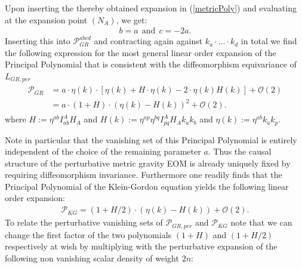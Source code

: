\documentclass[a4paper,12pt, DIV=14, BCOR=5mm, twoside, headsepline, numbers=noenddot]{scrbook}
\begin{document}
Upon inserting the thereby obtained expansion in (\ref{metricPoly}) and evaluating at the expansion point $(N_A)$, we get:
\begin{align}
    b = a \ \ \text{and} \ \ c = -2a.
\end{align}
Inserting this into $\mathcal{P}_{GR}^{abcd}$ and contracting again against $k_a\cdot ...\cdot k_d$ in total we find the following expression for the most general linear order expansion of the Principal Polynomial that is consistent with the diffeomorphism equivariance of $L_{GR,per}$
\begin{align}
\begin{aligned}
    \mathcal{P}_{GR} &= a \cdot  \eta(k) \cdot \left [\eta(k) + H \cdot \eta(k)  -
    2 \cdot  \eta(k) H(k) \right ] + \mathcal{O}(2)\\
    &= a \cdot (1 + H) \cdot (\eta(k) - H(k))^2 + \mathcal{O}(2).
\end{aligned}
\end{align}
where  $H:=\eta^{ab} I^A_{ab} H_{A}$ and $H(k) := \eta^{ap} \eta^{bq} I_{pq}^A H_A k_a k_b$ and $\eta(k) := \eta^{ab}k_a k_p$. 

Note in particular that the vanishing set of this Principal Polynomial is entirely independent of the choice of the remaining parameter $a$. Thus the causal structure of the perturbative metric gravity EOM is already uniquely fixed by requiring diffeomorphism invariance.
Furthermore one readily finds that the Principal Polynomial of the Klein-Gordon equation yields the following linear order expansion:
\begin{align}
    \mathcal{P}_{KG} = (1 + H/2) \cdot (\eta(k) - H(k)) + \mathcal{O}(2) .
\end{align}
To relate the perturbative vanishing sets of $\mathcal{P}_{GR,per}$ and $\mathcal{P}_{KG}$ note that we can change the first factor of the two polynomials $(1+H)$ and $(1+H/2)$ respectively at wish by multiplying with the perturbative expansion of the following non vanishing scalar density of weight $2n$:
\end{document}
